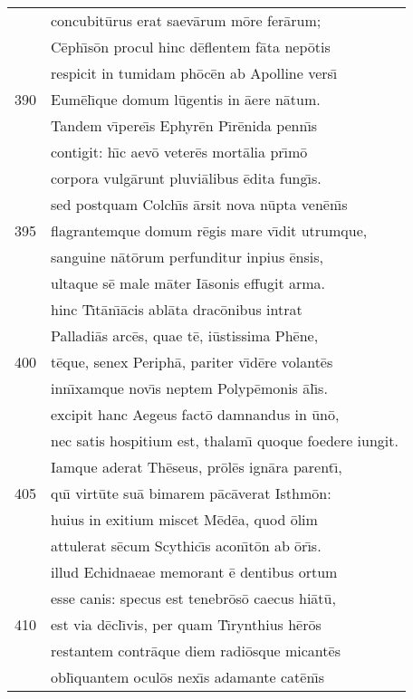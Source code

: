 \documentclass[paper=6in:9in,pagesize=pdftex,
               headinclude=on,footinclude=on,12pt]{scrbook}
\begin{document}
\begin{longtable}[p]{ r l }
 & concubit\=urus erat saev\=arum m\=ore fer\=arum;\\ 
 & C\=eph\={\i}s\=on procul hinc d\=eflentem f\=ata nep\=otis\\ 
 & respicit in tumidam ph\=oc\=en ab Apolline vers\={\i}\\ 
390 & Eum\=el\={\i}que domum l\=ugentis in \=aere n\=atum.\\ 
 & \indent Tandem v\={\i}pere\={\i}s Ephyr\=en P\={\i}r\=enida penn\={\i}s\\ 
 & contigit: h\={\i}c aev\=o veter\=es mort\=alia pr\={\i}m\=o\\ 
 & corpora vulg\=arunt pluvi\=alibus \=edita fung\={\i}s.\\ 
 & sed postquam Colch\={\i}s \=arsit nova n\=upta ven\=en\={\i}s\\ 
395 & flagrantemque domum r\=egis mare v\={\i}dit utrumque,\\ 
 & sanguine n\=at\=orum perfunditur inpius \=ensis,\\ 
 & ultaque s\=e male m\=ater I\=asonis effugit arma.\\ 
 & hinc T\={\i}t\=an\={\i}\=acis abl\=ata drac\=onibus intrat\\ 
 & Palladi\=as arc\=es, quae t\=e, i\=ustissima Ph\=ene,\\ 
400 & t\=eque, senex Periph\=a, pariter v\={\i}d\=ere volant\=es\\ 
 & inn\={\i}xamque nov\={\i}s neptem Polyp\=emonis \=al\={\i}s.\\ 
 & excipit hanc Aegeus fact\=o damnandus in \=un\=o,\\ 
 & nec satis hospitium est, thalam\={\i} quoque foedere iungit.\\ 
 & \indent Iamque aderat Th\=eseus, pr\=ol\=es ign\=ara parent\={\i},\\ 
405 & qu\={\i} virt\=ute su\=a bimarem p\=ac\=averat Isthm\=on:\\ 
 & huius in exitium miscet M\=ed\=ea, quod \=olim\\ 
 & attulerat s\=ecum Scythic\={\i}s acon\={\i}t\=on ab \=or\={\i}s.\\ 
 & illud Echidnaeae memorant \=e dentibus ortum\\ 
 & esse canis: specus est tenebr\=os\=o caecus hi\=at\=u,\\ 
410 & est via d\=ecl\={\i}vis, per quam T\={\i}rynthius h\=er\=os\\ 
 & restantem contr\=aque diem radi\=osque micant\=es\\ 
 & obl\={\i}quantem ocul\=os nex\={\i}s adamante cat\=en\={\i}s\\ 

\end{longtable}
\end{document}
